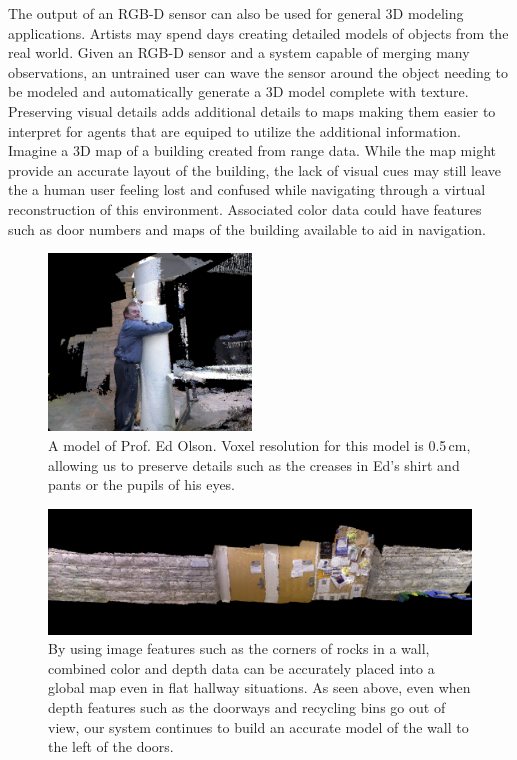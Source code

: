 \documentclass[letterpaper, 10pt, conference]{ieeeconf}
\begin{document}
The output of an RGB-D sensor can also be used for general 3D modeling
applications. Artists may spend days creating detailed models of objects from
the real world. Given an RGB-D sensor and a system capable of merging many
observations, an untrained user can wave the sensor around the object needing
to be modeled and automatically generate a 3D model complete with texture.
Preserving visual details adds additional details to maps making them easier to interpret for 
agents that are equiped to utilize the additional information. Imagine a 3D map of a building 
created from range data. While the map
might provide an accurate layout of the building, the lack of visual cues may still
leave the a human user feeling lost and confused while navigating through a virtual
reconstruction of this environment. Associated color data could
have features such as door numbers and maps of the building available to aid
in navigation.

\begin{figure}[t]
\centering
\includegraphics[width=0.48\textwidth]{figures/cropped_ed.png}
\caption{A model of Prof. Ed Olson.
Voxel resolution for this model is 0.5\,cm, allowing us to preserve details
such as the creases in Ed's shirt and pants or the pupils of his eyes.}
\label{fig:ed-model}
\end{figure}

\begin{figure}[t]
\centering
\includegraphics[width=.9\textwidth]{figures/CSE_Wall.png}
\caption{By using image features such as the corners of rocks in a wall,
combined color and depth data can be accurately placed into a global map even
in flat hallway situations. As seen above, even when depth features such as
the doorways and recycling bins go out of view, our system continues to build
an accurate model of the wall to the left of the doors.}
\label{fig:cse-wall}
\end{figure}
\end{document}
